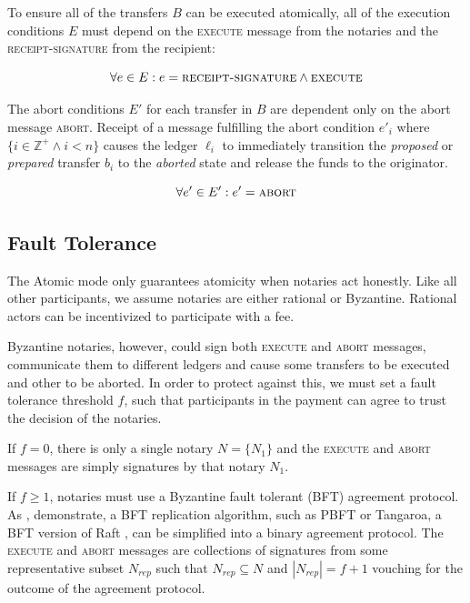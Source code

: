 \documentclass[letterpaper,twocolumn,10pt]{article}
\begin{document}
To ensure all of the transfers $B$ can be executed atomically, all of the execution conditions $E$ must depend on the \textsc{execute} message from the notaries and the \textsc{receipt-signature} from the recipient:


\begin{equation}
\forall e \in E : e = \textsc{receipt-signature} \land \textsc{execute}
\end{equation}

The abort conditions $E'$ for each transfer in $B$ are dependent only on the abort message \textsc{abort}. Receipt of a message fulfilling the abort condition $e'_i$ where $\{ i \in \mathbb{Z}^+ \land i < n \}$ causes the ledger $\ell_i$ to immediately transition the \textit{proposed} or \textit{prepared} transfer $b_i$ to the \textit{aborted} state and release the funds to the originator.

\begin{equation}
\forall e' \in E' : e' = \textsc{abort}
\end{equation}

\subsection{Fault Tolerance}
\label{subsec:fault-tolerance}

The Atomic mode only guarantees atomicity when notaries act honestly. Like all other participants, we assume notaries are either rational or Byzantine. Rational actors can be incentivized to participate with a fee.

Byzantine notaries, however, could sign both \textsc{execute} and \textsc{abort} messages, communicate them to different ledgers and cause some transfers to be executed and other to be aborted. In order to protect against this, we must set a fault tolerance threshold $f$, such that participants in the payment can agree to trust the decision of the notaries.

If $f = 0$, there is only a single notary $N = \{ N_1 \}$ and the \textsc{execute} and \textsc{abort} messages are simply signatures by that notary $N_1$.

If $f \geq 1$, notaries must use a Byzantine fault tolerant (BFT) agreement protocol. As \cite{gray2006consensus}, \cite{mohan1983method} demonstrate, a BFT replication algorithm, such as PBFT \cite{castro1999practical} or Tangaroa, a BFT version of Raft \cite{copelandtangaroa}, can be simplified into a binary agreement protocol. The \textsc{execute} and \textsc{abort} messages are collections of signatures from some representative subset $N_{rep}$ such that $N_{rep} \subseteq N$ and $|N_{rep}| = f+1$ vouching for the outcome of the agreement protocol.
\end{document}
